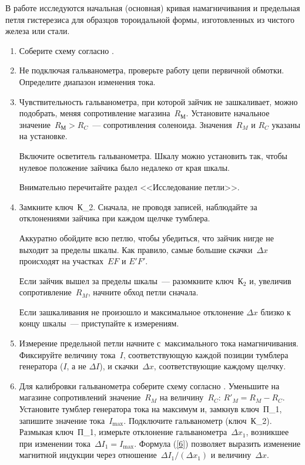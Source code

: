 \begin{lab:task}

	
	В работе исследуются начальная (основная) кривая намагничивания и предельная петля гистерезиса для образцов тороидальной
	формы, изготовленных из чистого железа или стали.
	
	\begin{enumerate}

	\item Соберите схему согласно .
	
	\item Не подключая гальванометра, проверьте работу цепи первичной обмотки. Определите диапазон изменения тока.
	
	\item Чувствительность гальванометра, при которой зайчик не зашкаливает, можно подобрать, меняя сопротивление
	магазина~$R_М$. Установите начальное значение~$R_М>R_C$~--- сопротивления соленоида. Значения~$R_M$ и $R_C$ указаны на
	установке.
	
	Включите осветитель гальванометра. Шкалу можно установить так, чтобы нулевое положение зайчика было недалеко от края
	шкалы.
	
	\begin{lab:warning}
		Внимательно перечитайте раздел <<Исследование петли>>.
	\end{lab:warning}
	
	\item Замкните ключ~К\_2. Сначала, не проводя записей, наблюдайте за отклонениями зайчика при каждом щелчке тумблера.
	
	Аккуратно обойдите всю петлю, чтобы убедиться, что зайчик нигде не выходит за пределы шкалы. Как правило, самые большие
	скачки~$\Delta x$ происходят на участках~$EF$ и $E'F'$.
	
	Если зайчик вышел за пределы шкалы~--- разомкните ключ~К$_2$ и, увеличив сопротивление~$R_M$, начните обход петли
	сначала.
	
	Если зашкаливания не произошло и максимальное отклонение $\Delta x$ близко к концу шкалы~--- приступайте к измерениям.
	
	\item Измерение предельной петли начните с~максимального тока намагничивания. Фиксируйте величину тока~$I$, соответствующую
	каждой позиции тумблера генератора ($I$, а не $\Delta I$), и скачки~$\Delta x$, соответствующие каждому щелчку.
	
	\item Для калибровки гальванометра соберите схему согласно . Уменьшите на магазине сопротивлений значение~$R_M$ на
	величину~$R_C$: $R'_M=R_M-R_C$. Установите тумблер генератора тока на максимум и, замкнув ключ~П\_1, запишите значение
	тока~$I_{\max}$. Подключите гальванометр (ключ~К\_2). Размыкая ключ~П\_1, измерьте отклонение гальванометра~$\Delta x_1$,
	возникшее при изменении тока~$\Delta I_1=I_{\max}$. Формула (\eqref{6}) позволяет выразить изменение магнитной индукции через
	отношение~$\Delta I_1/(\Delta x_1)$ и величину~$\Delta x$.
	

\end{enumerate}
\end{lab:task}
